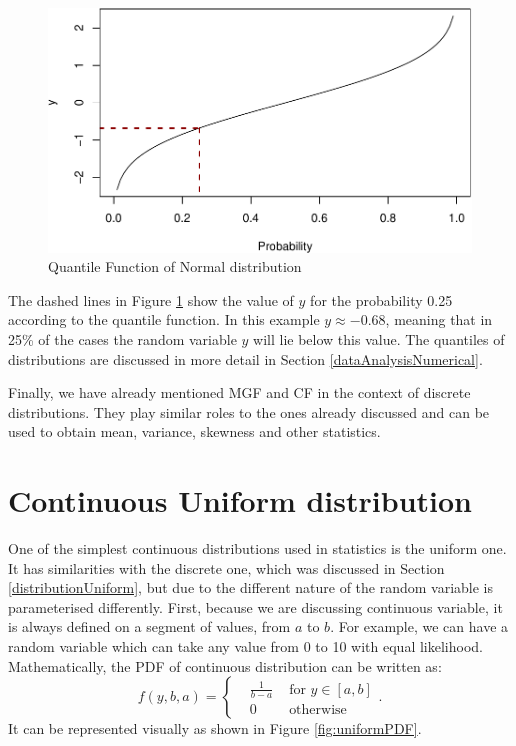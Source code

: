\documentclass[
]{book}
\theoremstyle{definition}
\theoremstyle{definition}
\theoremstyle{definition}
\theoremstyle{definition}
\theoremstyle{remark}
\begin{document}
\begin{figure}
\centering
\includegraphics{Svetunkov---Statistics-for-Business-Analytics_files/figure-latex/dnormPlotIntroQF-1.pdf}
\caption{\label{fig:dnormPlotIntroQF}Quantile Function of Normal distribution}
\end{figure}

The dashed lines in Figure \ref{fig:dnormPlotIntroQF} show the value of \(y\) for the probability 0.25 according to the quantile function. In this example \(y \approx -0.68\), meaning that in 25\% of the cases the random variable \(y\) will lie below this value. The quantiles of distributions are discussed in more detail in Section \ref{dataAnalysisNumerical}.

Finally, we have already mentioned MGF and CF in the context of discrete distributions. They play similar roles to the ones already discussed and can be used to obtain mean, variance, skewness and other statistics.

\hypertarget{distributionsUniformContinuous}{%
\section{Continuous Uniform distribution}\label{distributionsUniformContinuous}}

One of the simplest continuous distributions used in statistics is the uniform one. It has similarities with the discrete one, which was discussed in Section \ref{distributionUniform}, but due to the different nature of the random variable is parameterised differently. First, because we are discussing continuous variable, it is always defined on a segment of values, from \(a\) to \(b\). For example, we can have a random variable which can take any value from 0 to 10 with equal likelihood. Mathematically, the PDF of continuous distribution can be written as:
\begin{equation}
    f(y, b, a) = \left\{\begin{aligned}
                        & \frac{1}{b-a} & \text{ for } y \in [a, b] \\
                        & 0 & \text{ otherwise }
                    \end{aligned} \right. .
    \label{eq:ContinuousUniformPDF}
\end{equation}
It can be represented visually as shown in Figure \ref{fig:uniformPDF}.
\end{document}
